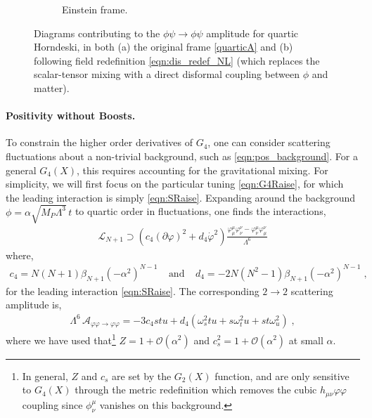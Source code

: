 \documentclass[11pt]{article}
\begin{document}
\begin{figure}
\begin{subfigure}[b]{0.3\textwidth}
         \caption{Einstein frame.}
     \end{subfigure}
     \qquad\qquad
\caption{
Diagrams contributing to the $\phi \psi \to \phi \psi$ amplitude for quartic Horndeski, in both (a) the original frame \eqref{quarticA} and (b) following field redefinition \eqref{eqn:dis_redef_NL} (which replaces the scalar-tensor mixing with a direct disformal coupling between $\phi$ and matter).
}
\label{fig:phiMat}
\end{figure}


\paragraph{Positivity without Boosts.}
To constrain the higher order derivatives of $G_4$, one can consider scattering fluctuations about a non-trivial background, such as \eqref{eqn:pos_background}.
For a general $G_4 (X)$, this requires accounting for the gravitational mixing. 
For simplicity, we will first focus on the particular tuning \eqref{eqn:G4Raise}, for which the leading interaction is simply \eqref{eqn:SRaise}. 
%
Expanding around the background $\phi = \alpha \sqrt{M_P \Lambda^3}\,  t$ to quartic order in fluctuations, one finds the interactions,  
\begin{align}
\mathcal{L}_{N+1} \supset 
\left( 
c_4  ( \partial \varphi )^2   + d_4  \dot\varphi^2 
  \right) \frac{  \varphi^\mu_\mu \varphi^\nu_\nu - \varphi^\mu_\nu \varphi^\nu_\mu }{ \Lambda^6 }
\end{align}
where,
\begin{align}
c_4 = N (N+1)   \beta_{N+1} (- \alpha^2 )^{N-1}  \;\;\;\; \text{and}  \;\;\;\; d_4 =  - 2 N (N^2 - 1)  \beta_{N+1} (-  \alpha^2 )^{N-1} \;  , 
\label{eqn:c4d4}
\end{align}
for the leading interaction \eqref{eqn:SRaise}.
The corresponding $2\to2$ scattering amplitude is,
\begin{align}
\Lambda^6 \, \mathcal{A}_{\varphi \varphi \to \varphi \varphi} 
= 
- 3 c_4 s t u + 
 d_4 (  \omega_s^2 t u + s \omega_t^2 u + s t \omega_u^2) \; , 
\label{eqn:pos_AGal}
\end{align}
where we have used that\footnote{
In general, $Z$ and $c_s$ are set by the $G_2 (X)$ function, and are only sensitive to $G_4 (X)$ through the metric redefinition which removes the cubic $h_{\mu\nu} \varphi \varphi$ coupling since $\phi^\mu_\nu$ vanishes on this background. 
} $Z = 1 + \mathcal{O} (\alpha^2)$ and $c_s^2 = 1 + \mathcal{O} ( \alpha^2 )$ at small $\alpha$. 
\end{document}
